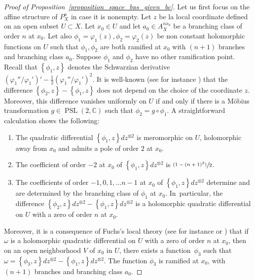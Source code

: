 \documentclass[10pt]{amsart}
\newcommand{\psfrac}[2]{\sfrac{(#1)}{#2}}
\newcommand{\C}{\mathbb C}
\DeclareMathOperator{\PSL}{PSL}
\theoremstyle{definition}
\theoremstyle{plain}
\begin{document}
\begin{proof}[Proof of Proposition~\ref{proposition_space_bps_given_bc}]
Let us first focus on the affine structure of $P_X^a$ in case it is nonempty.
Let $z$ be la local coordinate defined on an open subset $U \subset X$.
Let $x_0 \in U$ and let $a_0 \in A_X^{nx_0}$ be a branching class of order $n$ at $x_0$.
Let also $\phi_1 = \varphi_1(z), \phi_2 = \varphi_2(z)$ be non constant holomorphic functions on $U$ such that $\phi_1, \phi_2$ are both ramified at $x_0$ with $(n+1)$ branches and branching class $a_0$.
Suppose $\phi_1$ and $\phi_2$ have no other ramification point.
Recall that $\left\{\phi_1, z\right\}$ denotes the Schwarzian derivative $\left(\varphi_1''/\varphi_1'\right)' - \frac 1 2 \left(\varphi_1''/\varphi_1'\right)^2$.
It is well-known (see for instance \cite{gunning}) that the difference $\left\{\phi_2, z\right\} - \left\{\phi_1, z\right\}$ does not depend on the choice of the coordinate $z$.
Moreover, this difference vanishes uniformly on $U$ if and only if there is a Möbius transformation $g \in \PSL(2, \C)$ such that $\phi_2 = g \circ \phi_1$.
A straightforward calculation shows the following:
\begin{enumerate}
\item
The quadratic differential $\left\{\phi_1, z\right\}dz^{\otimes 2}$ is meromorphic on $U$, holomorphic away from $x_0$ and admits a pole of order $2$ at $x_0$.
\item
The coefficient of order $-2$ at $x_0$ of $\left\{\phi_1, z\right\}dz^{\otimes 2}$ is $\psfrac{1 - (n+1)^2}2$.
\item
The coefficients of order $-1, 0, 1, \dots n-1$ at $x_0$ of $\left\{\phi_1, z\right\}dz^{\otimes 2}$ determine and are determined by the branching class of $\phi_1$ at $x_0$. In~particular, the difference $\left\{\phi_2, z\right\}dz^{\otimes 2} - \left\{\phi_1, z\right\}dz^{\otimes 2}$ is a holomorphic quadratic differential on $U$ with a zero of order $n$ at $x_0$.
\end{enumerate}

Moreover, it is a consequence of Fuchs's local theory (see for instance \cite{mandelbaum_1} or \cite[\S IX.1]{saint-gervais_en}) that if $\omega$ is a holomorphic quadratic differential on $U$ with a zero of order $n$ at $x_0$, then on an open neighborhood $V$ of $x_0$ in $U$, there exists a function~$\phi_3$ such that $\omega = \left\{\phi_3, z\right\}dz^{\otimes 2} - \left\{\phi_1, z\right\}dz^{\otimes 2}$.
The function $\phi_3$ is ramified at $x_0$, with $(n+1)$ branches and branching class $a_0$.


\end{proof}
\end{document}
